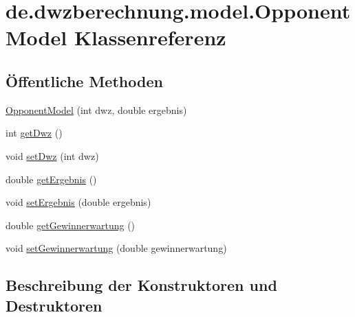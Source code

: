 \hypertarget{classde_1_1dwzberechnung_1_1model_1_1_opponent_model}{}\section{de.\+dwzberechnung.\+model.\+Opponent\+Model Klassenreferenz}
\label{classde_1_1dwzberechnung_1_1model_1_1_opponent_model}
\subsection*{Öffentliche Methoden}
\begin{DoxyCompactItemize}
\item 
\hyperlink{classde_1_1dwzberechnung_1_1model_1_1_opponent_model_a3f255d315d0f8a7cd75d90417cf85f7d}{Opponent\+Model} (int dwz, double ergebnis)
\item 
int \hyperlink{classde_1_1dwzberechnung_1_1model_1_1_opponent_model_a3e557d07dd6d13aaa8e8d8508252b3f8}{get\+Dwz} ()
\item 
void \hyperlink{classde_1_1dwzberechnung_1_1model_1_1_opponent_model_a7e8eac744b03ae946e77cbab43d4f269}{set\+Dwz} (int dwz)
\item 
double \hyperlink{classde_1_1dwzberechnung_1_1model_1_1_opponent_model_a7f4152438748de489c83ac70207de8a3}{get\+Ergebnis} ()
\item 
void \hyperlink{classde_1_1dwzberechnung_1_1model_1_1_opponent_model_acee97bc444191198152e9ccc15c3103e}{set\+Ergebnis} (double ergebnis)
\item 
double \hyperlink{classde_1_1dwzberechnung_1_1model_1_1_opponent_model_ac7f64d9e1c28771d09d5610079726119}{get\+Gewinnerwartung} ()
\item 
void \hyperlink{classde_1_1dwzberechnung_1_1model_1_1_opponent_model_aedcfd5c24ce6a4f6e1cf95525f824f6b}{set\+Gewinnerwartung} (double gewinnerwartung)
\end{DoxyCompactItemize}


\subsection{Beschreibung der Konstruktoren und Destruktoren}
